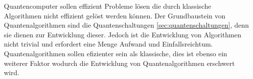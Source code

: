 Quantencomputer sollen effizient Probleme l\"osen die durch klassische Algorithmen nicht effizient gel\"ost werden k\"onnen. Der Grundbaustein von Quantenalgorithmen sind die Quantenschaltungen \ref{sec:quantenschaltungen}, denn sie dienen zur Entwicklung dieser. Jedoch ist die Entwicklung von Algorithmen nicht trivial und erfordert eine Menge Aufwand und Einfallsreichtum. Quantenalgorithmen sollen efizienter sein als klassische, dies ist ebenso ein weiterer Faktor wodurch die Entwicklung von Quantenalgorithmen erschwert wird.
